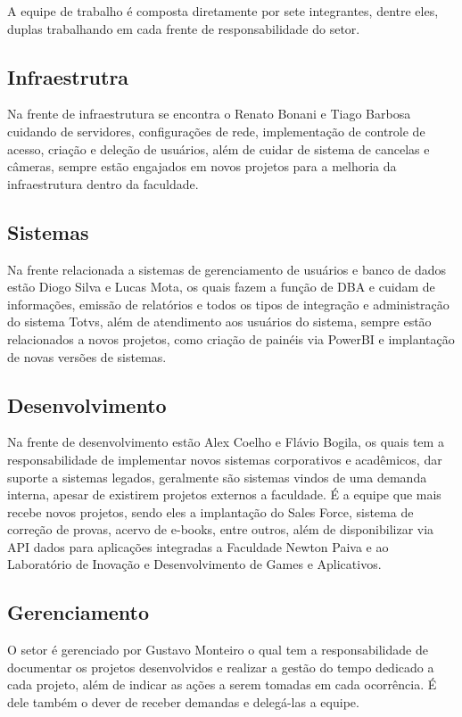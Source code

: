 \documentclass[
	12pt,				%
	oneside,			%
	a4paper,			%
	chapter=TITLE,		%
	section=TITLE,		%
	sumario=tradicional %
	english,			%
	french,				%
	spanish,			%
	brazil				%
	]{abntex2}
\begin{document}
\label{sec:equipetrabalho}
A equipe de trabalho é composta diretamente por sete integrantes, dentre eles, duplas trabalhando em cada frente de responsabilidade do setor.

\subsection{Infraestrutra}
Na frente de infraestrutura se encontra o Renato Bonani e Tiago Barbosa cuidando de servidores, configurações de rede, implementação de controle de acesso, criação e deleção de usuários, além de cuidar de sistema de cancelas e câmeras, sempre estão engajados em novos projetos para a melhoria da infraestrutura dentro da faculdade.

\subsection{Sistemas}
Na frente relacionada a sistemas de gerenciamento de usuários e banco de dados estão Diogo Silva e Lucas Mota, os quais fazem a função de DBA  e cuidam de informações, emissão de relatórios e todos os tipos de integração e administração do sistema Totvs, além de atendimento aos usuários do sistema, sempre estão relacionados a novos projetos, como criação de painéis via PowerBI e implantação de novas versões de sistemas.

\subsection{Desenvolvimento}
Na frente de desenvolvimento estão Alex Coelho e Flávio Bogila, os quais tem a responsabilidade de implementar novos sistemas corporativos e acadêmicos, dar suporte a sistemas legados, geralmente são sistemas vindos de uma demanda interna, apesar de existirem projetos externos a faculdade. É a equipe que mais recebe novos projetos, sendo eles a implantação do Sales Force, sistema de correção de provas, acervo de e-books, entre outros, além de disponibilizar via API dados para aplicações integradas a Faculdade Newton Paiva e ao Laboratório de Inovação e Desenvolvimento de Games e Aplicativos.

\subsection{Gerenciamento}
O setor é gerenciado por Gustavo Monteiro o qual tem a responsabilidade de documentar os projetos desenvolvidos e realizar a gestão do tempo dedicado a cada projeto, além de indicar as ações a serem tomadas em cada ocorrência. É dele também o dever de receber demandas e delegá-las a equipe.
\end{document}
